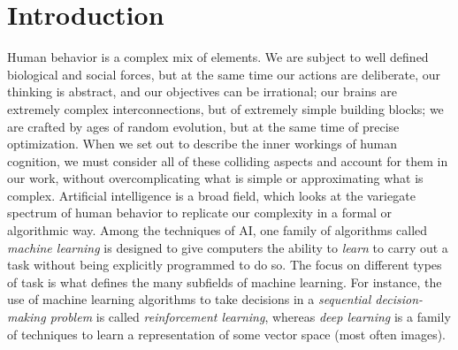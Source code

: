 \chapter{Introduction}
\label{ch1_intro}
\thispagestyle{empty}

\vspace{0.5cm}
 
Human behavior is a complex mix of elements. We are subject to 
well defined biological and social forces, but at the same time our actions are 
deliberate, our thinking is abstract, and our objectives can be irrational; 
our brains are extremely complex interconnections, but of extremely simple 
building blocks; we are crafted by ages of random evolution, but at the same time 
of precise optimization. 
When we set out to describe the inner workings of human cognition, we must 
consider all of these colliding aspects and account for them in our work, 
without overcomplicating what is simple or approximating what is complex.
Artificial intelligence is a broad field, which looks at the variegate spectrum 
of human behavior to replicate our complexity in a formal or algorithmic way. 
Among the techniques of AI, one family of algorithms called \textit{machine
learning} is designed to give computers the ability to \textit{learn} to carry 
out a task without being explicitly programmed to do so. The focus on different
types of task is what defines the many subfields of machine learning.
For instance, the use of machine learning algorithms to take decisions in a 
\textit{sequential decision-making problem} is called \textit{reinforcement 
learning}, whereas \textit{deep learning} is a family of techniques to learn a 
representation of some vector space (most often images).

